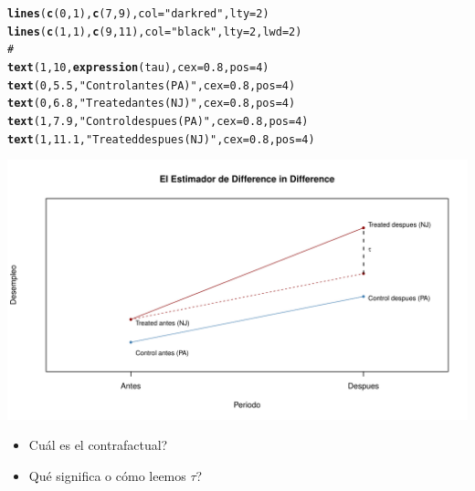 \documentclass[onesided]{article}\usepackage[]{graphicx}\usepackage[]{color}
\makeatletter
\def\maxwidth{ %
  \ifdim\Gin@nat@width>\linewidth
    \linewidth
  \else
    \Gin@nat@width
  \fi
}
\newcommand{\hlnum}[1]{\textcolor[rgb]{0.686,0.059,0.569}{#1}}%
\newcommand{\hlstr}[1]{\textcolor[rgb]{0.192,0.494,0.8}{#1}}%
\newcommand{\hlcom}[1]{\textcolor[rgb]{0.678,0.584,0.686}{\textit{#1}}}%
\newcommand{\hlstd}[1]{\textcolor[rgb]{0.345,0.345,0.345}{#1}}%
\newcommand{\hlkwc}[1]{\textcolor[rgb]{0.333,0.667,0.333}{#1}}%
\newcommand{\hlkwd}[1]{\textcolor[rgb]{0.737,0.353,0.396}{\textbf{#1}}}%
\newenvironment{kframe}{%
 \def\at@end@of@kframe{}%
 \ifinner\ifhmode%
  \def\at@end@of@kframe{\end{minipage}}%
  \begin{minipage}{\columnwidth}%
 \fi\fi%
 \def\FrameCommand##1{\hskip\@totalleftmargin \hskip-\fboxsep
 \colorbox{shadecolor}{##1}\hskip-\fboxsep
     \hskip-\linewidth \hskip-\@totalleftmargin \hskip\columnwidth}%
 \MakeFramed {\advance\hsize-\width
   \@totalleftmargin\z@ \linewidth\hsize
   \@setminipage}}%
 {\par\unskip\endMakeFramed%
 \at@end@of@kframe}
\newenvironment{knitrout}{}{} %
\makeatother
\begin{document}
\begin{knitrout}
\begin{kframe}
\begin{alltt}
\hlkwd{lines}\hlstd{(}\hlkwd{c}\hlstd{(}\hlnum{0}\hlstd{,} \hlnum{1}\hlstd{),} \hlkwd{c}\hlstd{(}\hlnum{7}\hlstd{,} \hlnum{9}\hlstd{),} \hlkwc{col} \hlstd{=} \hlstr{"darkred"}\hlstd{,} \hlkwc{lty} \hlstd{=} \hlnum{2}\hlstd{)}
\hlkwd{lines}\hlstd{(}\hlkwd{c}\hlstd{(}\hlnum{1}\hlstd{,} \hlnum{1}\hlstd{),} \hlkwd{c}\hlstd{(}\hlnum{9}\hlstd{,} \hlnum{11}\hlstd{),} \hlkwc{col} \hlstd{=} \hlstr{"black"}\hlstd{,} \hlkwc{lty} \hlstd{=} \hlnum{2}\hlstd{,} \hlkwc{lwd} \hlstd{=} \hlnum{2}\hlstd{)}
\hlcom{# }
\hlkwd{text}\hlstd{(}\hlnum{1}\hlstd{,} \hlnum{10}\hlstd{,} \hlkwd{expression}\hlstd{(tau),} \hlkwc{cex} \hlstd{=} \hlnum{0.8}\hlstd{,} \hlkwc{pos} \hlstd{=} \hlnum{4}\hlstd{)}
\hlkwd{text}\hlstd{(}\hlnum{0}\hlstd{,} \hlnum{5.5}\hlstd{,} \hlstr{"Control antes (PA)"}\hlstd{,} \hlkwc{cex} \hlstd{=} \hlnum{0.8} \hlstd{,} \hlkwc{pos} \hlstd{=} \hlnum{4}\hlstd{)}
\hlkwd{text}\hlstd{(}\hlnum{0}\hlstd{,} \hlnum{6.8}\hlstd{,} \hlstr{"Treated antes (NJ)"}\hlstd{,} \hlkwc{cex} \hlstd{=} \hlnum{0.8} \hlstd{,} \hlkwc{pos} \hlstd{=} \hlnum{4}\hlstd{)}
\hlkwd{text}\hlstd{(}\hlnum{1}\hlstd{,} \hlnum{7.9}\hlstd{,} \hlstr{"Control despues (PA)"}\hlstd{,} \hlkwc{cex} \hlstd{=} \hlnum{0.8} \hlstd{,} \hlkwc{pos} \hlstd{=} \hlnum{4}\hlstd{)}
\hlkwd{text}\hlstd{(}\hlnum{1}\hlstd{,} \hlnum{11.1}\hlstd{,} \hlstr{"Treated despues (NJ)"}\hlstd{,} \hlkwc{cex} \hlstd{=} \hlnum{0.8} \hlstd{,} \hlkwc{pos} \hlstd{=} \hlnum{4}\hlstd{)}
\end{alltt}
\end{kframe}

{\centering \includegraphics[width=\maxwidth]{figure/dif:dif-1} 

}



\end{knitrout}

\begin{itemize}
\item {\color{red}Cu\'al es el contrafactual?}
\item {\color{red}Qu\'e significa o c\'omo leemos $\tau$?}
\end{itemize}
\end{document}
